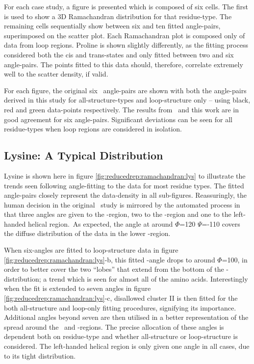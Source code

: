 For each case study, a figure is presented which is composed of  six cells. The first is used to show a 3D Ramachandran distribution for that residue-type. The remaining cells sequentially show between six and ten fitted angle-pairs, superimposed on the scatter plot. Each Ramachandran plot is composed only of data from loop regions. Proline is shown slightly differently, as the fitting process considered both the cis and trans-states and only fitted between two and six angle-pairs.  The points fitted to this data  should, therefore, correlate extremely well to the scatter density, if  valid. 

For each figure, the original six \raft\  angle-pairs are shown with both the angle-pairs derived in this study for all-structure-types and loop-structure only -- using black, red and green data-points respectively. The results from \raft\ and this work are in good agreement for six angle-pairs. Significant deviations can be seen for all residue-types when loop regions are considered in isolation. 

\newcommand{\anglesetscale}{0.444}

\subsection{Lysine: A Typical Distribution}

Lysine is shown here in figure \ref{fig:reducedrep:ramachandran:lys} to illustrate the trends seen following angle-fitting to the data for most residue types. The fitted angle-pairs closely represent the data-density in all sub-figures. Reassuringly, the human decision in the original \raft\ study is mirrored by the automated process in that three angles are given to the \be-region, two to the \al-region and one to the left-handed helical region.\ As expected, the angle at around $\Phi$=120 $\Psi$=-110 covers the diffuse distribution of the data in the lower \be-region. 

When six-angles are fitted to loop-structure data in figure \ref{fig:reducedrep:ramachandran:lys}-b, this fitted \be-angle drops to around $\Phi$=100, in order to better cover the two ``lobes'' that extend from the bottom of the \be-distribution; a trend which is seen for almost all of the amino acids. Interestingly when the fit is extended to seven angles in figure \ref{fig:reducedrep:ramachandran:lys}-c,  disallowed cluster II is then fitted for the both all-structure and loop-only fitting procedures, signifying its importance.
Additional angles beyond seven are then utilised in a better representation of the spread around the \al\ and \be-regions.
The precise allocation of these angles is dependent both on residue-type and whether all-structure or loop-structure is considered. The left-handed helical region is only given one angle in all cases, due to its tight distribution.

